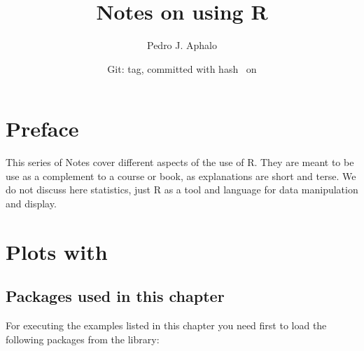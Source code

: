 \documentclass[paper=a4,10pt,div=17,headsepline,BCOR=12mm,twoside,open=right]{scrbook}\usepackage{knitr}
\title{Notes on using R}
\author{Pedro J. Aphalo}
\date{Git: tag\gitVtagn , committed with hash \gitAbbrevHash\ on \gitAuthorIsoDate}
\begin{document}











\maketitle


\tableofcontents




\chapter*{Preface}

This series of Notes cover different aspects of the use of R. They are meant to be use as a complement to a course or book, as explanations
are short and terse. We do not discuss here statistics, just R as a tool and language for data manipulation and display.











\chapter[Plots with ggpplot]{Plots with \ggplot}\label{chap:R:plotting}

\section{Packages used in this chapter}

For executing the examples listed in this chapter you need first to load the following packages from the library:
\end{document}
